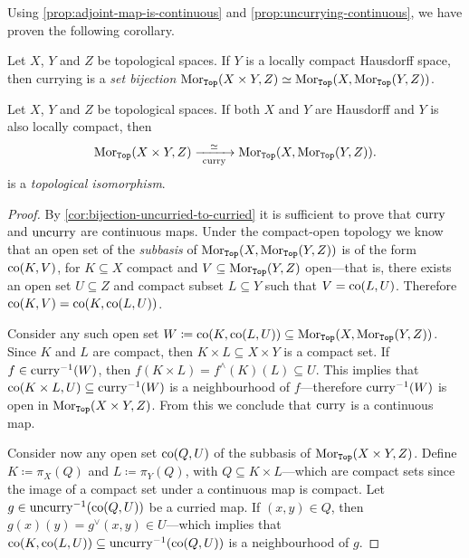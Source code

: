 Using \cref{prop:adjoint-map-is-continuous} and
\cref{prop:uncurrying-continuous}, we have proven the following corollary.

\begin{corollary}
\label{cor:bijection-uncurried-to-curried}
Let \(X\), \(Y\) and \(Z\) be topological spaces. If \(Y\) is a locally compact
Hausdorff space, then currying is a \emph{set bijection}
\(\operatorname{Mor}_{{\texttt{Top}}}(X \times Y, Z) \simeq \operatorname{Mor}_{{\texttt{Top}}}(X, \operatorname{Mor}_{{\texttt{Top}}}(Y, Z))\).
\end{corollary}

\begin{theorem}
\label{thm:currying-top-iso}
Let \(X\), \(Y\) and \(Z\) be topological spaces. If both \(X\) and \(Y\) are
Hausdorff and \(Y\) is also locally compact, then
\[
\operatorname{Mor}_{{\texttt{Top}}}(X \times Y, Z)
\xrightarrow[ \ \operatorname{curry}\ ]{\simeq} \operatorname{Mor}_{{\texttt{Top}}}(X, \operatorname{Mor}_{{\texttt{Top}}}(Y, Z)).
\]
is a \emph{topological isomorphism}.
\end{theorem}

\begin{proof}
By \cref{cor:bijection-uncurried-to-curried} it is sufficient to prove that
\(\operatorname{curry}\) and \(\operatorname{uncurry}\) are continuous maps. Under the compact-open topology
we know that an open set of the \emph{subbasis} of
\(\operatorname{Mor}_{{\texttt{Top}}}(X, \operatorname{Mor}_{{\texttt{Top}}}(Y, Z))\) is of the form \(\operatorname{co}(K, V)\), for
\(K \subseteq X\) compact and \(V \subseteq \operatorname{Mor}_{{\texttt{Top}}}(Y, Z)\) open---that is,
there exists an open set \(U \subseteq Z\) and compact subset \(L \subseteq Y\)
such that \(V = \operatorname{co}(L, U)\). Therefore \(\operatorname{co}(K, V) = \operatorname{co}(K, \operatorname{co}(L, U))\).

Consider any such open set
\(W \coloneq \operatorname{co}(K, \operatorname{co}(L, U)) \subseteq \operatorname{Mor}_{{\texttt{Top}}}(X, \operatorname{Mor}_{{\texttt{Top}}}(Y, Z))\).
Since \(K\) and \(L\) are compact, then \(K \times L \subseteq X \times Y\) is a
compact set. If \(f \in \operatorname{curry}^{-1}(W)\), then
\(f(K \times L) = f^{\wedge}(K)(L) \subseteq U\). This implies that
\(\operatorname{co}(K \times L, U) \subseteq \operatorname{curry}^{-1}(W)\) is a neighbourhood of
\(f\)---therefore \(\operatorname{curry}^{-1}(W)\) is open in \(\operatorname{Mor}_{{\texttt{Top}}}(X \times Y,
Z)\). From this we conclude that \(\operatorname{curry}\) is a continuous map.

Consider now any open set \(\operatorname{co}(Q, U)\) of the subbasis of
\(\operatorname{Mor}_{{\texttt{Top}}}(X \times Y, Z)\). Define \(K \coloneq \pi_X(Q)\) and
\(L \coloneq \pi_Y(Q)\), with \(Q \subseteq K \times L\)---which are compact
sets since the image of a compact set under a continuous map is compact. Let
\(g \in \operatorname{uncurry}^{-1}(\operatorname{co}(Q, U))\) be a curried map. If \((x, y) \in Q\), then
\(g(x)(y) = g^{\vee}(x, y) \in U\)---which implies that \(\operatorname{co}(K, \operatorname{co}(L, U))
\subseteq \operatorname{uncurry}^{-1}(\operatorname{co}(Q, U))\) is a neighbourhood of \(g\).
\end{proof}

